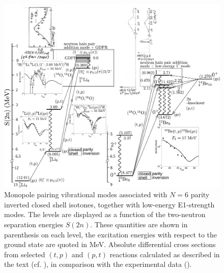    \begin{figure}
   	\centerline{\includegraphics*[width=21cm,angle=90]{nutshell/figs/fig3_8_1_v2}}
   	\caption{Monopole pairing vibrational modes associated with 
   		$N=6$ parity inverted closed shell isotones, together with low-energy E1-strength modes. 
   		The levels are  displayed as a function of the two-neutron separation energies $S(2n)$. 
   		These quantities are shown in parenthesis on each level, the excitation energies with respect to the ground state are quoted in MeV. 
   		Absolute differential cross sections from selected $(t,p)$ and $(p,t)$ reactions calculated as described in the text (cf. \cite{Potel:10,Potel:14}), 
   		in comparison with the experimental data (\cite{Young:71,Fortune:94}).}\label{fig3.8.1}
   \end{figure}






